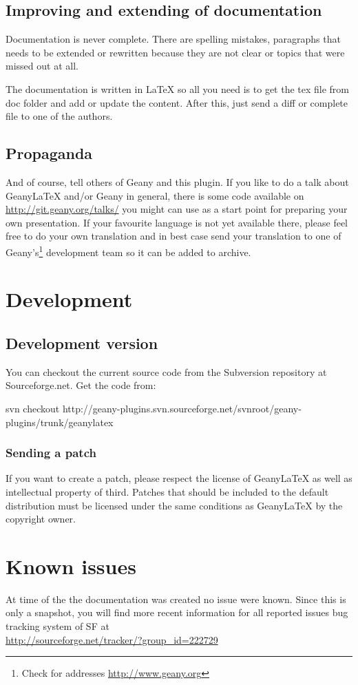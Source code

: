 \documentclass[%
a4paper,%
10pt,%
oneside,%
DIV18,
headsepline,
plainheadsepline,
footsepline,
plainfootsepline,
bibtotoc,%
liststotoc,%
BCOR12mm,%
halfparskip,%
openany,%
]{scrartcl}
\begin{document}
\subsection{Improving and extending of documentation}
Documentation is never complete. There are spelling mistakes,
paragraphs that needs to be extended or rewritten because they are not
clear or topics that were missed out at all.

The documentation is written in \LaTeX{} so all you need is to get the
tex file from doc folder and add or update the content.
After this, just send a diff or complete file to one of the authors.

\subsection{Propaganda}
And of course, tell others of Geany and this plugin. If you like to do
a talk about Geany\LaTeX{} and/or Geany in general, there is some code
available on \url{http://git.geany.org/talks/} you might can use as a
start point for preparing your own presentation. If your favourite
language is not yet available there, please feel free to do your own
translation and in best case send your translation to one of
Geany's\footnote{Check for addresses \url{http://www.geany.org}}
development team so it can be added to archive.


\section{Development}
\subsection{Development version}
You can checkout the current source code from the Subversion repository
at Sourceforge.net. Get the code from:

svn checkout
http://geany-plugins.svn.sourceforge.net/svnroot/geany-plugins/trunk/geanylatex

\subsubsection{Sending a patch}
If you want to create a patch, please respect the license of
Geany\LaTeX{} as well as intellectual property of third. Patches that
should be included to the default distribution must be licensed under
the same conditions as Geany\LaTeX{} by the copyright owner.

\section{Known issues}
At time of the the documentation was created no issue were known.
Since this is only a snapshot, you will find more recent information
for all reported issues bug tracking system of SF at \\
\url{http://sourceforge.net/tracker/?group\_id=222729}
\end{document}
